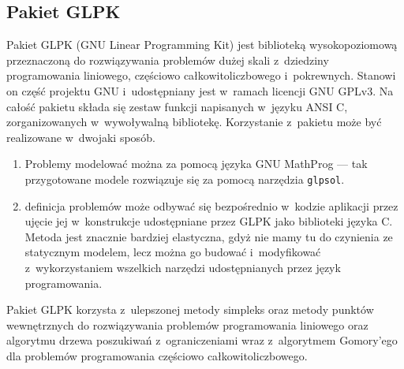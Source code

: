 \subsection{Pakiet GLPK} %
\label{ss_internals_glpk}
\par{
  Pakiet GLPK (GNU Linear Programming Kit) jest biblioteką wysokopoziomową przeznaczoną do rozwiązywania problemów dużej skali z~dziedziny programowania liniowego, częściowo całkowitoliczbowego i~pokrewnych.
  Stanowi on część projektu GNU i~udostępniany jest w~ramach licencji GNU GPLv3.
  Na całość pakietu składa się zestaw funkcji napisanych w~języku ANSI C, zorganizowanych w~wywoływalną bibliotekę.
  Korzystanie z~pakietu może być realizowane w~dwojaki sposób.
  \begin{enumerate}
    \item Problemy modelować można za pomocą języka GNU MathProg --- tak przygotowane modele rozwiązuje się za pomocą narzędzia \texttt{glpsol}.
    \item definicja problemów może odbywać się bezpośrednio w~kodzie aplikacji przez ujęcie jej w~konstrukcje udostępniane przez GLPK jako biblioteki języka C. Metoda jest znacznie bardziej elastyczna, gdyż nie mamy tu do czynienia ze statycznym modelem, lecz można go budować i~modyfikować z~wykorzystaniem wszelkich narzędzi udostępnianych przez język programowania.
  \end{enumerate}
}
\par{
  Pakiet GLPK korzysta z~ulepszonej metody simpleks oraz metody punktów wewnętrznych do rozwiązywania problemów programowania liniowego oraz algorytmu drzewa poszukiwań z~ograniczeniami wraz z~algorytmem Gomory'ego dla problemów programowania częściowo całkowitoliczbowego.
}
